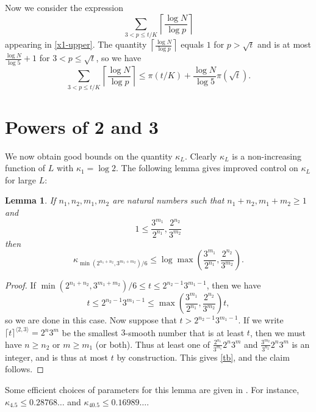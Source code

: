 \documentclass[12pt,a4paper,reqno]{amsart}
\numberwithin{equation}{section}
\theoremstyle{plain}
\newtheorem{lemma}[theorem]{Lemma}
\theoremstyle{definition}
\begin{document}
Now we consider the expression
$$ \sum_{3 < p \leq t/K} \left\lceil \frac{\log N}{\log p} \right\rceil$$
appearing in \eqref{x1-upper}.  The quantity $\left\lceil \frac{\log N}{\log p} \right\rceil$ equals $1$ for $p > \sqrt{t}$ and is at most $\frac{\log N}{\log 5} + 1$ for $3 < p \leq \sqrt{t}$, so we have
$$ \sum_{3 < p \leq t/K} \left\lceil \frac{\log N}{\log p} \right\rceil \leq \pi(t/K) + \frac{\log N}{\log 5} \pi(\sqrt{t}).$$


\appendix

\section{Powers of 2 and 3}\label{power-sec}

We now obtain good bounds on the quantity $\kappa_L$.  Clearly $\kappa_L$ is a non-increasing function of $L$ with $\kappa_1 = \log 2$.  The following lemma gives improved control on $\kappa_L$ for large $L$:

\begin{lemma}\label{lemcount-0}  If $n_1,n_2,m_1,m_2$ are natural numbers such that $n_1+n_2, m_1+m_2 \geq 1$ and
$$ 1 \leq \frac{3^{m_1}}{2^{n_1}}, \frac{2^{n_2}}{3^{m_2}}$$
then
$$ \kappa_{\min( 2^{n_1+n_2},3^{m_1+m_2})/6} \leq \log \max\left(\frac{3^{m_1}}{2^{n_1}}, \frac{2^{n_2}}{3^{m_2}}\right).$$
\end{lemma}

\begin{proof}  If $\min( 2^{n_1+n_2},3^{m_1+m_2})/6 \leq t \leq 2^{n_2-1} 3^{m_1-1}$, then we have
\begin{equation}\label{tb} 
  t \leq 2^{n_2-1} 3^{m_1-1} \leq \max\left(\frac{3^{m_1}}{2^{n_1}}, \frac{2^{n_2}}{3^{m_2}}\right) t,
\end{equation}
so we are done in this case.  Now suppose that $t > 2^{n_2-1} 3^{m_1-1}$.
If we write $\lceil t \rceil^{\langle 2,3 \rangle} =2^n 3^m$ be the smallest $3$-smooth number that is at least $t$, then we must have $n \geq n_2$ or $m \geq m_1$ (or both).  Thus at least one of $\frac{2^{n_1}}{3^{m_1}} 2^n 3^m$ and $\frac{3^{m_2}}{3^{n_2}} 2^n 3^m$ is an integer, and is thus at most $t$ by construction.  This gives \eqref{tb}, and the claim follows.
\end{proof}

Some efficient choices of parameters for this lemma are given in .  For instance, $\kappa_{4.5} \leq 0.28768\dots$ and $\kappa_{40.5} \leq 0.16989\dots$.
\end{document}
